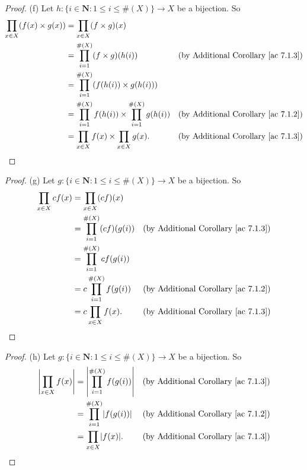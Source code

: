\begin{proof}{(f)}
    Let \(h : \{i \in \mathbf{N} : 1 \leq i \leq \#(X)\} \to X\) be a bijection.
    So
    \begin{align*}
        \prod_{x \in X} (f(x) \times g(x)) & = \prod_{x \in X} (f \times g)(x)                                                                                      \\
                                           & = \prod_{i = 1}^{\#(X)} (f \times g)(h(i))                           & \text{(by Additional Corollary \ref{ac 7.1.3})} \\
                                           & = \prod_{i = 1}^{\#(X)} (f(h(i)) \times g(h(i)))                                                                       \\
                                           & = \prod_{i = 1}^{\#(X)} f(h(i)) \times \prod_{i = 1}^{\#(X)} g(h(i)) & \text{(by Additional Corollary \ref{ac 7.1.2})} \\
                                           & = \prod_{x \in X} f(x) \times \prod_{x \in X} g(x).                  & \text{(by Additional Corollary \ref{ac 7.1.3})}
    \end{align*}
\end{proof}

\begin{proof}{(g)}
    Let \(g : \{i \in \mathbf{N} : 1 \leq i \leq \#(X)\} \to X\) be a bijection.
    So
    \begin{align*}
        \prod_{x \in X} cf(x) & = \prod_{x \in X} (cf)(x)                                                            \\
                              & = \prod_{i = 1}^{\#(X)} (cf)(g(i)) & \text{(by Additional Corollary \ref{ac 7.1.3})} \\
                              & = \prod_{i = 1}^{\#(X)} cf(g(i))                                                     \\
                              & = c\prod_{i = 1}^{\#(X)} f(g(i))   & \text{(by Additional Corollary \ref{ac 7.1.2})} \\
                              & = c\prod_{x \in X} f(x).           & \text{(by Additional Corollary \ref{ac 7.1.3})}
    \end{align*}
\end{proof}

\begin{proof}{(h)}
    Let \(g : \{i \in \mathbf{N} : 1 \leq i \leq \#(X)\} \to X\) be a bijection.
    So
    \begin{align*}
        \abs*{\prod_{x \in X} f(x)} & = \abs*{\prod_{i = 1}^{\#(X)} f(g(i))} & \text{(by Additional Corollary \ref{ac 7.1.3})} \\
                                    & = \prod_{i = 1}^{\#(X)} \abs*{f(g(i))} & \text{(by Additional Corollary \ref{ac 7.1.2})} \\
                                    & = \prod_{x \in X} \abs*{f(x)}.         & \text{(by Additional Corollary \ref{ac 7.1.3})}
    \end{align*}
\end{proof}

